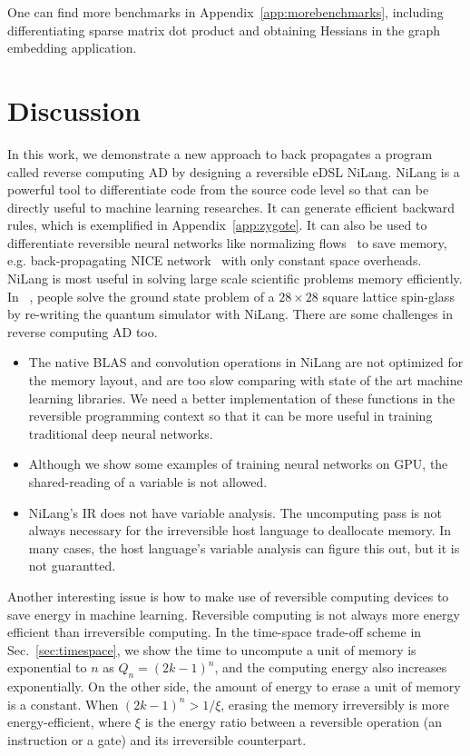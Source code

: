 \documentclass{article}
\newcommand{\<}{\langle}
\renewcommand{\>}{\rangle}
\renewcommand{\cite}[1]{{\citep{#1}}}
\newcommand{\Sec}[1]{Sec.~\ref{#1}}
\newcommand{\App}[1]{Appendix~\ref{#1}}
\theoremstyle{definition}\newtheorem{definition}{\textit{Definition}}
\begin{document}
One can find more benchmarks in \App{app:morebenchmarks}, including differentiating sparse matrix dot product and obtaining Hessians in the graph embedding application.

\section{Discussion}
In this work, we demonstrate a new approach to back propagates a program called reverse computing AD by designing a reversible eDSL NiLang.
NiLang is a powerful tool to differentiate code from the source code level so that can be directly useful to machine learning researches. It can generate efficient backward rules, which is exemplified in \App{app:zygote}.
It can also be used to differentiate reversible neural networks like normalizing flows~\cite{Kobyzev2019} to save memory, e.g. back-propagating NICE network~\cite{Dinh2014} with only constant space overheads.
NiLang is most useful in solving large scale scientific problems memory efficiently. In ~\citet{Liu2020}, people solve the ground state problem of a $28\times 28$ square lattice spin-glass by re-writing the quantum simulator with NiLang.
There are some challenges in reverse computing AD too.
\begin{itemize}
    \item The native BLAS and convolution operations in NiLang are not optimized for the memory layout, and are too slow comparing with state of the art machine learning libraries. We need a better implementation of these functions in the reversible programming context so that it can be more useful in training traditional deep neural networks.
    \item Although we show some examples of training neural networks on GPU, the shared-reading of a variable is not allowed.
    \item NiLang's IR does not have variable analysis. The uncomputing pass is not always necessary for the irreversible host language to deallocate memory.
In many cases, the host language's variable analysis can figure this out, but it is not guarantted.
\end{itemize}

Another interesting issue is how to make use of reversible computing devices to save energy in machine learning.
Reversible computing is not always more energy efficient than irreversible computing. In the time-space trade-off scheme in \Sec{sec:timespace}, we show the time to uncompute a unit of memory is exponential to $n$ as $Q_n = (2k-1)^n$, and the computing energy also increases exponentially. On the other side, the amount of energy to erase a unit of memory is a constant.
When $(2k-1)^{n} > 1/\xi$, erasing the memory irreversibly is more energy-efficient, where $\xi$ is the energy ratio between a reversible operation (an instruction or a gate) and its irreversible counterpart.
\end{document}
